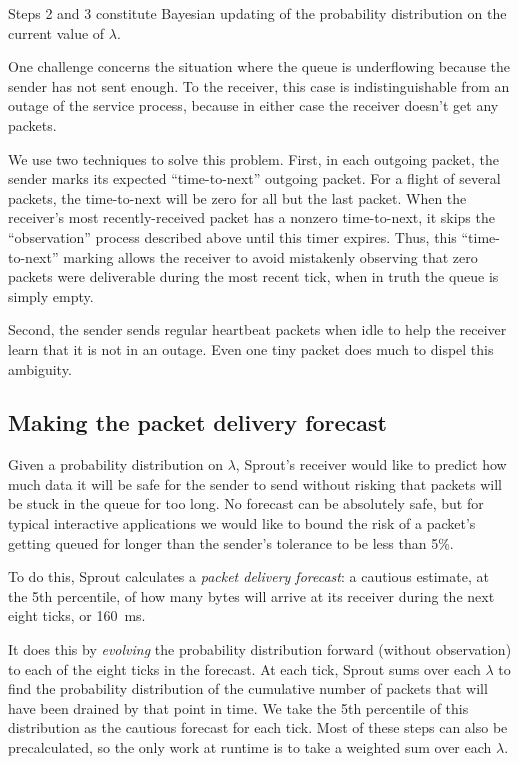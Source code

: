 Steps 2 and 3 constitute Bayesian updating of the probability
distribution on the current value of $\lambda$.

One challenge concerns the
situation where the queue is underflowing because the sender has not
sent enough. To the receiver, this case is indistinguishable from an
outage of the service process, because in either case the receiver
doesn't get any packets.

We use two techniques to solve this problem. First, in each outgoing
packet, the sender marks its expected ``time-to-next'' outgoing
packet.  For a flight of several packets,
the time-to-next will be zero for all but the last packet. When the
receiver's most recently-received packet has a nonzero time-to-next,
it skips the ``observation'' process described above until this timer
expires. Thus, this ``time-to-next'' marking allows the receiver to
avoid mistakenly observing that zero packets were deliverable during
the most recent tick, when in truth the queue is simply empty.

Second, the sender sends regular heartbeat packets when idle to help
the receiver learn that it is not in an outage. Even one tiny packet
does much to dispel this ambiguity.

\subsection{Making the packet delivery forecast}

Given a probability distribution on $\lambda$, Sprout's receiver would
like to predict how much data it will be safe for the sender to send
without risking that packets will be stuck in the queue for too
long. No forecast can be absolutely safe, but for typical interactive
applications we would like to bound the risk of a packet's getting
queued for longer than the sender's tolerance to be less than 5\%.

To do this, Sprout calculates a \emph{packet delivery forecast}: a
cautious estimate, at the 5th percentile, of how many bytes will
arrive at its receiver during the next eight ticks, or 160~ms.

It does this by \emph{evolving} the probability distribution forward
(without observation) to each of the eight ticks in the forecast.  At
each tick, Sprout sums over each $\lambda$ to find the probability
distribution of the cumulative number of packets that will have been
drained by that point in time. We take the 5th percentile of this
distribution as the cautious forecast for each tick. Most
of these steps can also be precalculated, so the only work at
runtime is to take a weighted sum over each $\lambda$.

